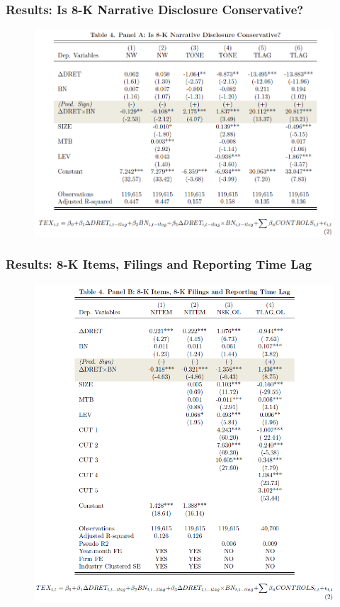 \documentclass{beamer}
\begin{document}
\begin{frame}
\frametitle{Results: Is 8-K Narrative Disclosure Conservative?}
	\begin{figure}[h]
	\centering
	\includegraphics[width=0.7\linewidth]{tab4panA}
	\label{tab4panA}
	\end{figure}
\end{frame}
\begin{frame}
\frametitle{Results: 8-K Items, Filings and Reporting Time Lag}
	\begin{figure}[h]
	\centering
	\includegraphics[width=0.6\linewidth]{tab4panB}
	\label{tab4panB}
	\end{figure}
\end{frame}
\end{document}
